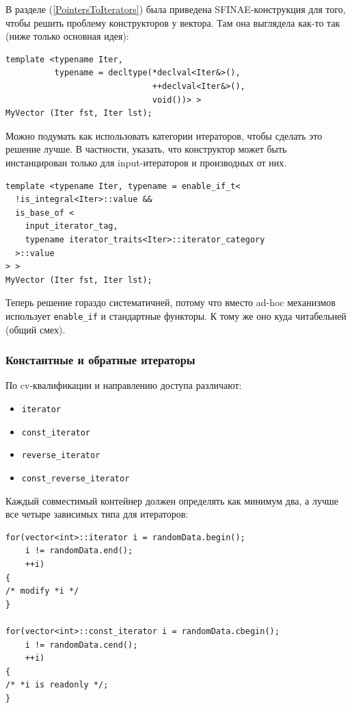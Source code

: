 \documentclass[a4paper,12pt,oneside]{article}
\begin{document}
В разделе (\ref{PointersToIterators}) была приведена SFINAE-конструкция для того, чтобы решить проблему конструкторов у вектора. Там она выглядела как-то так (ниже только основная идея):

\begin{lstlisting}
template <typename Iter, 
          typename = decltype(*declval<Iter&>(),
                              ++declval<Iter&>(), 
                              void())> >
MyVector (Iter fst, Iter lst);
\end{lstlisting}

Можно подумать как использовать категории итераторов, чтобы сделать это решение лучше. В частности, указать, что конструктор может быть инстанцирован только для input-итераторов и производных от них.

\begin{lstlisting}
template <typename Iter, typename = enable_if_t<
  !is_integral<Iter>::value &&
  is_base_of <
    input_iterator_tag, 
    typename iterator_traits<Iter>::iterator_category
  >::value
> >
MyVector (Iter fst, Iter lst);
\end{lstlisting}

Теперь решение гораздо систематичней, потому что вместо ad-hoc механизмов использует \lstinline!enable_if! и стандартные функторы. К тому же оно куда читабельней (общий смех).

\subsubsection{Константные и обратные итераторы}\label{subsub:constrev}

По cv-квалификации и направлению доступа различают:

\begin{itemize}
\item \lstinline!iterator!
\item \lstinline!const_iterator!
\item \lstinline!reverse_iterator!
\item \lstinline!const_reverse_iterator!
\end{itemize}

Каждый совместимый контейнер должен определять как минимум два, а лучше все четыре зависимых типа для итераторов:

\begin{lstlisting}
for(vector<int>::iterator i = randomData.begin(); 
    i != randomData.end(); 
    ++i) 
{
/* modify *i */
}

for(vector<int>::const_iterator i = randomData.cbegin(); 
    i != randomData.cend(); 
    ++i) 
{
/* *i is readonly */;
}
\end{lstlisting}
\end{document}
